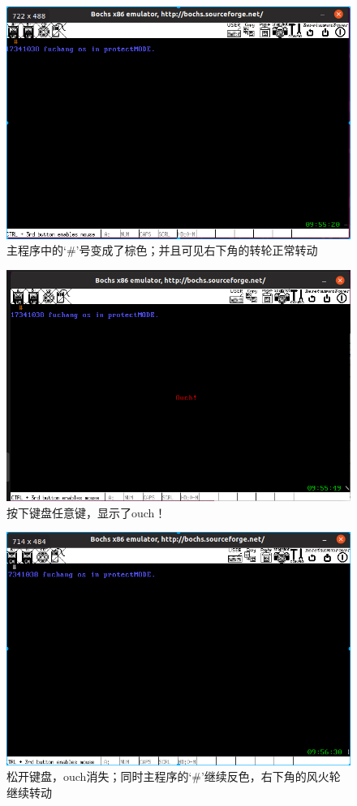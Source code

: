 \documentclass[a4paper,11pt,UTF8]{ctexart}
\newcommand{\bottomcaption}{%
\setlength{\abovecaptionskip}{6pt}%
\setlength{\belowcaptionskip}{6pt}%
\caption}
\begin{document}
	\begin{figure}[htbp]
		\centering
		\includegraphics[width=15cm]{expr_image/DeepinScrot-5455.png}
		\bottomcaption{主程序中的‘\#’号变成了棕色；并且可见右下角的转轮正常转动}
	\end{figure}

	\begin{figure}[htbp]
		\centering
		\includegraphics[width=15cm]{expr_image/4.png}
		\bottomcaption{按下键盘任意键，显示了ouch！}
	\end{figure}
	
	\begin{figure}[htbp]
		\centering
		\includegraphics[width=15cm]{expr_image/DeepinScrot-5546.png}
		\bottomcaption{松开键盘，ouch消失；同时主程序的‘\#’继续反色，右下角的风火轮继续转动}
	\end{figure}
\end{document}
